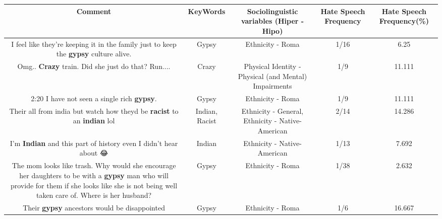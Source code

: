 \documentclass[11pt]{article}
\newlength\mylength
\begin{document}
\begin{center}
\setlength\mylength{\dimexpr\textwidth - 1\arrayrulewidth - 50\tabcolsep}
\begin{longtable}{|C{.65\mylength}|C{.30\mylength}|C{.12\mylength}|C{.12\mylength}|C{.12\mylength}|}
\hline
\textbf{Comment} & \textbf{KeyWords} & \textbf{Sociolinguistic variables (Hiper - Hipo)}  & \textbf{Hate Speech Frequency} & \textbf{Hate Speech Frequency(\%)} \\
\hline{}\small I feel like they're keeping it in the family just to keep the \textbf{gypsy} culture alive.\normalsize   & Gypsy & Ethnicity - Roma & 1/16 & 6.25 \\  \hline
  \small Omg.. \textbf{Crazy} train. Did she just do that? Run....\normalsize   & Crazy & Physical Identity - Physical (and Mental) Impairments & 1/9 & 11.111 \\  \hline
  \small 2:20 I have not seen a single rich \textbf{gypsy}.\normalsize   & Gypsy & Ethnicity - Roma & 1/9 & 11.111 \\  \hline
  \small Their all from india but watch how theyd be \textbf{racist} to an \textbf{indian} lol\normalsize   & Indian, Racist & Ethnicity - General, Ethnicity - Native-American & 2/14 & 14.286 \\  \hline
  \small I'm \textbf{Indian} and this part of history even I didn't hear about 😂\normalsize   & Indian & Ethnicity - Native-American & 1/13 & 7.692 \\  \hline
  \small The mom looks like trash.  Why would she encourage her daughters to be with a \textbf{gypsy} man who will provide for them if she looks like she is not being well taken care of.  Where is her husband?\normalsize   & Gypsy & Ethnicity - Roma & 1/38 & 2.632 \\  \hline
  \small Their \textbf{gypsy} ancestors would be disappointed\normalsize   & Gypsy & Ethnicity - Roma & 1/6 & 16.667 \\  \hline

\end{longtable}
\end{center}
\end{document}
